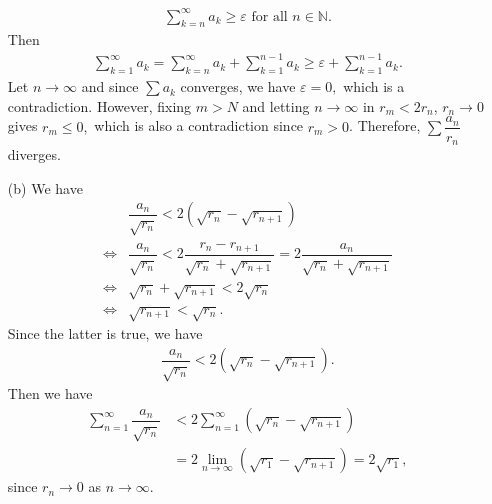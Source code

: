 \begin{problem}
\begin{solution}
\begin{itemize}
    \begin{align*}
        \sum_{k=n}^\infty a_k \ge \varepsilon\text{ for all }n\in\mathbb{N}.
    \end{align*}
    Then 
    \begin{align*}
        \sum_{k=1}^\infty a_k=\sum_{k=n}^\infty a_k+\sum_{k=1}^{n-1} a_k\ge \varepsilon+\sum_{k=1}^{n-1} a_k.
    \end{align*}
    Let $n\rightarrow \infty$ and since $\sum a_k$ converges, we have $\varepsilon=0,$ which is a contradiction. However, fixing $m>N$ and letting $n\rightarrow\infty$ in $r_m<2r_n$, $r_n\rightarrow 0$ gives $r_m\le 0,$ which is also a contradiction since $r_m>0$. Therefore, $\sum\dfrac{a_n}{r_n}$ diverges.
    \item[(b)]We have 
      \begin{align*}
        &\dfrac{a_n}{\sqrt{r_n}}<2(\sqrt{r_n}-\sqrt{r_{n+1}})\\
        \Longleftrightarrow &\dfrac{a_n}{\sqrt{r_n}} <2\dfrac{r_n-r_{n+1}}{\sqrt{r_n}+\sqrt{r_{n+1}}}=2\dfrac{a_n}{\sqrt{r_n}+\sqrt{r_{n+1}}}\\
        \Longleftrightarrow&\sqrt{r_n}+\sqrt{r_{n+1}}<2\sqrt{r_n}\\
        \Longleftrightarrow&\sqrt{r_{n+1}}<\sqrt{r_n}.
    \end{align*}
    Since the latter is true, we have 
    \begin{align*}
        \dfrac{a_n}{\sqrt{r_n}}<2(\sqrt{r_n}-\sqrt{r_{n+1}}).
    \end{align*}
    Then we have
     \begin{align*}
         \sum_{n=1}^\infty \dfrac{a_n}{\sqrt{r_n}} &<2\sum_{n=1}^\infty(\sqrt{r_n}-\sqrt{r_{n+1}})\\
         &=2\lim_{n\rightarrow\infty}(\sqrt{r_1}-\sqrt{r_{n+1}})=2\sqrt{r_1},
     \end{align*}
     since $r_n\rightarrow 0$ as $n\rightarrow\infty.$
\end{itemize}
\end{solution}
\end{problem}

